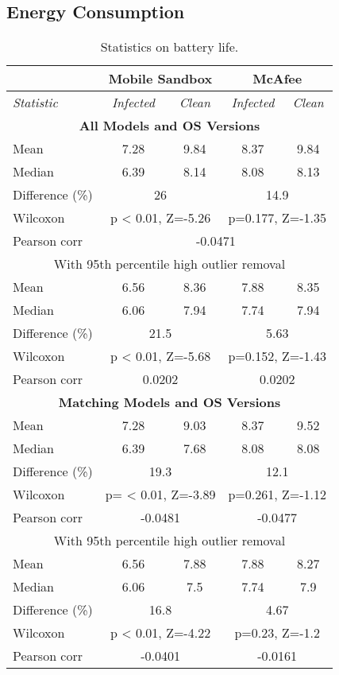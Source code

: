 \else
\subsection{Energy Consumption}
\label{subsec:predictions:energy}
\begin{table}[!htb]
\centering
\small{
\begin{tabular}{|l|c c|c c|}
\hline
& \multicolumn{2}{c|}{\textbf{Mobile Sandbox}} & \multicolumn{2}{c|}{\textbf{McAfee}} \\
\hline
\textit{Statistic} & \textit{Infected} & \textit{Clean} & \textit{Infected} & \textit{Clean} \\
\hline
\multicolumn{5}{c}{\textbf{All Models and OS Versions}} \\
\hline
Mean & 7.28 & 9.84 & 	 8.37 & 9.84 \\ 
Median & 6.39 & 8.14 & 	 8.08 & 8.13 \\ 
Difference (\%) & \multicolumn{2}{c|}{26} & \multicolumn{2}{c|}{14.9} \\ 
Wilcoxon & \multicolumn{2}{c|}{p < 0.01, Z=-5.26} & 	 \multicolumn{2}{c|}{p=0.177, Z=-1.35} \\ 
Pearson corr & \multicolumn{4}{c|}{-0.0471}\\ 
\hline
\multicolumn{5}{c}{With 95th percentile high outlier removal} \\ 
\hline
Mean & 6.56 & 8.36 & 	 7.88 & 8.35 \\ 
Median & 6.06 & 7.94 & 	 7.74 & 7.94 \\ 
Difference (\%)  & \multicolumn{2}{c|}{21.5} & 	 \multicolumn{2}{c|}{5.63} \\ 
Wilcoxon & \multicolumn{2}{c|}{p < 0.01, Z=-5.68} & 	 \multicolumn{2}{c|}{p=0.152, Z=-1.43} \\ 
Pearson corr & \multicolumn{2}{c|}{0.0202}& 	 \multicolumn{2}{c|}{0.0202}\\ 
\hline
\multicolumn{5}{c}{\textbf{Matching Models and OS Versions}} \\
\hline
Mean & 7.28 & 9.03 & 	 8.37 & 9.52 \\ 
Median & 6.39 & 7.68 & 	 8.08 & 8.08 \\ 
Difference (\%)  & \multicolumn{2}{c|}{19.3} & 	 \multicolumn{2}{c|}{12.1} \\ 
Wilcoxon & \multicolumn{2}{c|}{p= < 0.01, Z=-3.89} & 	 \multicolumn{2}{c|}{p=0.261, Z=-1.12} \\ 
Pearson corr & \multicolumn{2}{c|}{-0.0481}& 	 \multicolumn{2}{c|}{-0.0477}\\ 
\hline
\multicolumn{5}{c}{With 95th percentile high outlier removal} \\ 
\hline
Mean & 6.56 & 7.88 & 	 7.88 & 8.27 \\ 
Median & 6.06 & 7.5 & 	 7.74 & 7.9 \\ 
Difference (\%)  & \multicolumn{2}{c|}{16.8} & 	 \multicolumn{2}{c|}{4.67} \\ 
Wilcoxon & \multicolumn{2}{c|}{p < 0.01, Z=-4.22} & 	 \multicolumn{2}{c|}{p=0.23, Z=-1.2} \\ 
Pearson corr & \multicolumn{2}{c|}{-0.0401}& 	 \multicolumn{2}{c|}{-0.0161}\\
\hline
\end{tabular}
}
\caption{Statistics on battery life.\label{tbl:battresults}}
\end{table}
